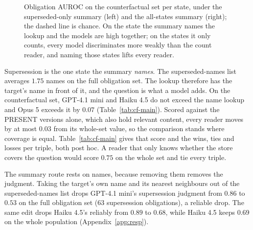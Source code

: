 \documentclass{article}
\begin{document}
\begin{figure}[t]
\caption{Obligation AUROC on the counterfactual set per state, under the superseded-only summary (left) and the all-states summary (right); the dashed line is chance. On the state the summary names the lookup and the models are high together; on the states it only counts, every model discriminates more weakly than the count reader, and naming those states lifts every reader.}
\label{fig:perstate}
\end{figure}

Supersession is the one state the summary \emph{names}.
The superseded-names list averages $1.75$ names on the full obligation set.
The lookup therefore has the target's name in front of it, and the question is what a model adds.
On the counterfactual set, GPT-4.1 mini and Haiku 4.5 do not exceed the name lookup and Opus 5 exceeds it by $0.07$ (Table~\ref{tab:cf-main}).
Scored against the PRESENT versions alone, which also hold relevant content, every reader moves by at most $0.03$ from its whole-set value, so the comparison stands where coverage is equal.
Table~\ref{tab:cf-main} gives that score and the wins, ties and losses per triple, both post hoc.
A reader that only knows whether the store covers the question would score $0.75$ on the whole set and tie every triple.

The summary route rests on names, because removing them removes the judgment.
Taking the target's own name and its nearest neighbours out of the superseded-names list drops GPT-4.1 mini's supersession judgment from $0.86$ to $0.53$ on the full obligation set ($63$ supersession obligations), a reliable drop.
The same edit drops Haiku 4.5's reliably from $0.89$ to $0.68$, while Haiku 4.5 keeps $0.69$ on the whole population (Appendix~\ref{app:resp}).
\end{document}
